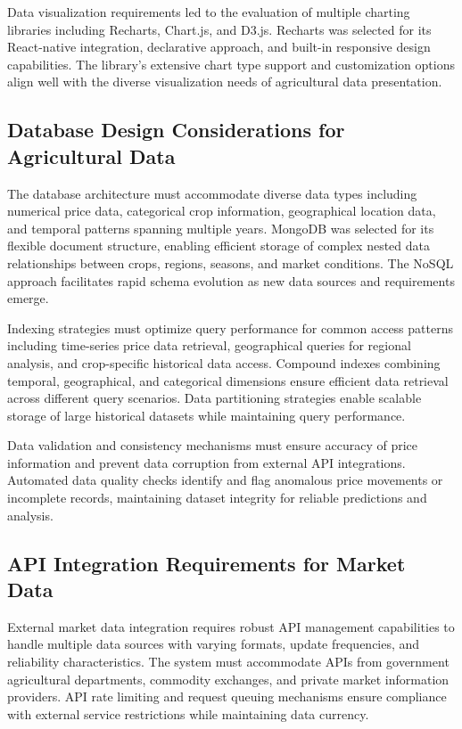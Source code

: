 Data visualization requirements led to the evaluation of multiple charting libraries including Recharts, Chart.js, and D3.js. Recharts was selected for its React-native integration, declarative approach, and built-in responsive design capabilities. The library's extensive chart type support and customization options align well with the diverse visualization needs of agricultural data presentation.

\subsection{Database Design Considerations for Agricultural Data}

The database architecture must accommodate diverse data types including numerical price data, categorical crop information, geographical location data, and temporal patterns spanning multiple years. MongoDB was selected for its flexible document structure, enabling efficient storage of complex nested data relationships between crops, regions, seasons, and market conditions. The NoSQL approach facilitates rapid schema evolution as new data sources and requirements emerge.

Indexing strategies must optimize query performance for common access patterns including time-series price data retrieval, geographical queries for regional analysis, and crop-specific historical data access. Compound indexes combining temporal, geographical, and categorical dimensions ensure efficient data retrieval across different query scenarios. Data partitioning strategies enable scalable storage of large historical datasets while maintaining query performance.

Data validation and consistency mechanisms must ensure accuracy of price information and prevent data corruption from external API integrations. Automated data quality checks identify and flag anomalous price movements or incomplete records, maintaining dataset integrity for reliable predictions and analysis.

\subsection{API Integration Requirements for Market Data}

External market data integration requires robust API management capabilities to handle multiple data sources with varying formats, update frequencies, and reliability characteristics. The system must accommodate APIs from government agricultural departments, commodity exchanges, and private market information providers. API rate limiting and request queuing mechanisms ensure compliance with external service restrictions while maintaining data currency.

